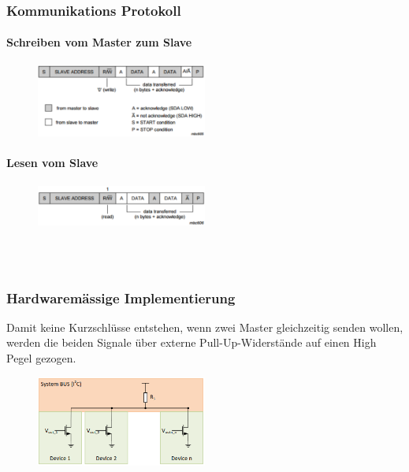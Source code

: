 \begin{multicols}{2}
    \subsubsection{Kommunikations Protokoll}
    \paragraph{Schreiben vom Master zum Slave}
    \begin{figure}[H]
        \includegraphics[width=0.5\textwidth]{images/i2c_protocolWrite.png}
    \end{figure}

    \paragraph{Lesen vom Slave}
    \begin{figure}[H]
        \includegraphics[width=0.5\textwidth]{images/i2c_protocolRead.png}
    \end{figure}

    \ \\ \ \\

    \subsubsection{Hardwaremässige Implementierung}
    Damit keine Kurzschlüsse entstehen, wenn zwei Master gleichzeitig senden wollen, werden die beiden Signale über externe Pull-Up-Widerstände auf einen High Pegel gezogen.
    \begin{figure}[H]
        \includegraphics[width=0.5\textwidth]{images/i2c_hardware.png}
    \end{figure}
\end{multicols}


